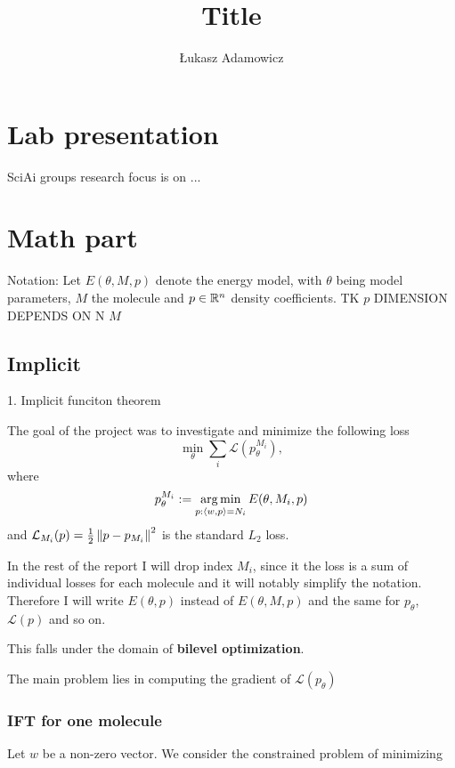 \documentclass[a4paper,10pt]{report}
\title{Title}
\author{Łukasz Adamowicz}
\begin{document}
\maketitle

\begin{abstract}
\end{abstract}



\section{ Lab presentation}
SciAi groups research focus is on ...

 \section{Math part}
Notation: Let $E(\theta, M ,p)$ denote the energy model, with $\theta$ being model parameters, $M$ the molecule and $p\in \mathbb{R}^n$ density coefficients.
TK $p$ DIMENSION DEPENDS ON N $M$

 \subsection{Implicit}
1. Implicit funciton theorem

The goal of the project was to investigate and minimize the following loss
\begin{equation}
 \min_\theta \sum_i \mathcal{L}(p_{\theta}^{M_i}),
\end{equation}
where
\begin{equation}
  p_\theta^{M_i}:=\operatorname*{arg\,min}_{p : \langle w, p \rangle=N_i} E(\theta,M_i,p)
\end{equation}
and $\mathcal{L}_{M_i}(p) = \frac{1}{2}\left\|p-p_{M_i}\right\|^2$ is the standard $L_2$ loss.

In the rest of the report I will drop index $M_i$, since it the loss is a sum of individual losses for each molecule and it will notably simplify the notation.
Therefore I will write $E(\theta,p)$ instead of $E(\theta,M,p)$ and the same for $p_\theta$, $\mathcal{L}(p)$ and so on.

This falls under the domain of \textbf{bilevel optimization}.

The main problem lies in computing the gradient of $\mathcal{L}(p_\theta)$


\subsubsection{ IFT for one molecule}
Let $w$ be a non-zero vector.
We consider the constrained problem of minimizing
\end{document}

